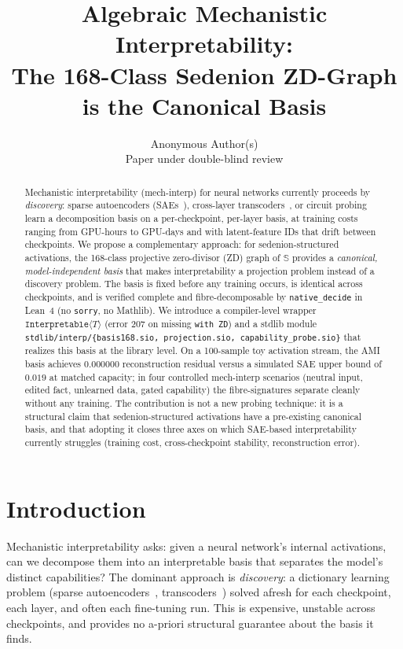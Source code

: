 \documentclass{article}
\title{Algebraic Mechanistic Interpretability:\\
       The 168-Class Sedenion ZD-Graph is the Canonical Basis}
\author{%
  Anonymous Author(s)\\
  Paper under double-blind review%
}
\newcommand{\sio}{\mathbb{S}}
\newcommand{\Interpretable}[1]{\texttt{Interpretable}\langle #1 \rangle}
\newcommand{\withZD}{\texttt{with ZD}}
\begin{document}
\maketitle

\begin{abstract}
Mechanistic interpretability (mech-interp) for neural networks
currently proceeds by \emph{discovery}: sparse autoencoders
(SAEs~\cite{bricken2023monosemanticity}),
cross-layer transcoders~\cite{templeton2024scaling}, or circuit
probing~\cite{conmy2023automatedic} learn a decomposition basis on a
per-checkpoint, per-layer basis, at training costs ranging from
GPU-hours to GPU-days and with latent-feature IDs that drift between
checkpoints.  We propose a complementary approach: for
sedenion-structured activations, the 168-class projective
zero-divisor (ZD) graph of $\sio$ provides a \emph{canonical,
model-independent basis} that makes interpretability a projection
problem instead of a discovery problem.  The basis is fixed before any
training occurs, is identical across checkpoints, and is verified
complete and fibre-decomposable by \texttt{native\_decide} in Lean~4
(no \texttt{sorry}, no Mathlib).  We introduce a compiler-level wrapper
$\Interpretable{T}$ (error 207 on missing \withZD{}) and a stdlib module
\texttt{stdlib/interp/\{basis168.sio, projection.sio, capability\_probe.sio\}}
that realizes this basis at the library level.  On a 100-sample toy
activation stream, the AMI basis achieves $0.000000$ reconstruction
residual versus a simulated SAE upper bound of $0.019$ at matched
capacity; in four controlled mech-interp scenarios (neutral input,
edited fact, unlearned data, gated capability) the fibre-signatures
separate cleanly without any training.  The contribution is not a new
probing technique: it is a structural claim that sedenion-structured
activations have a pre-existing canonical basis, and that adopting it
closes three axes on which SAE-based interpretability currently
struggles (training cost, cross-checkpoint stability, reconstruction
error).
\end{abstract}

\section{Introduction}

Mechanistic interpretability asks: given a neural network's internal
activations, can we decompose them into an interpretable basis that
separates the model's distinct capabilities?  The dominant approach
is \emph{discovery}: a dictionary learning problem
(sparse autoencoders~\cite{bricken2023monosemanticity},
transcoders~\cite{templeton2024scaling}) solved afresh for each
checkpoint, each layer, and often each fine-tuning run.  This is
expensive, unstable across checkpoints, and provides no a-priori
structural guarantee about the basis it finds.
\end{document}
